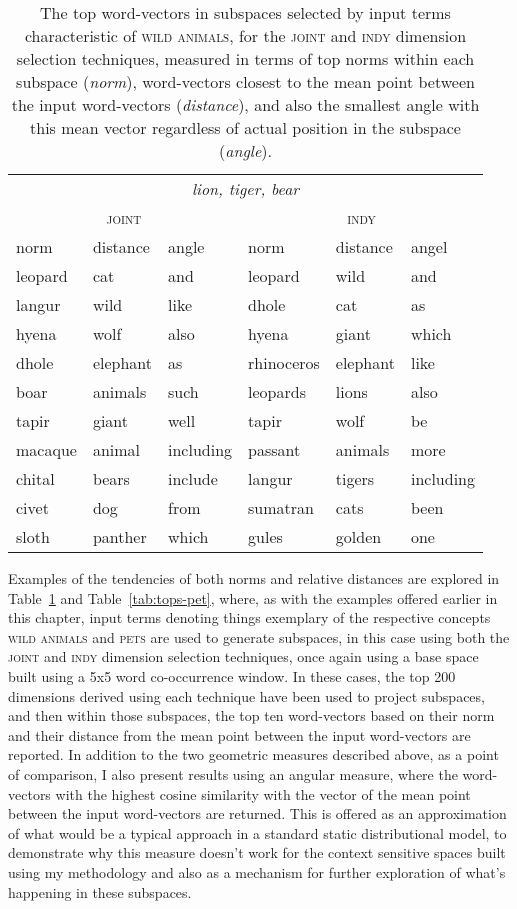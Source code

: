 \begin{table}
\centering
\begin{tabular}{lll|lll}
\hline
\multicolumn{6}{c}{\emph{lion, tiger, bear}} \\
\multicolumn{3}{c}{\textsc{joint}} & \multicolumn{3}{c}{\textsc{indy}} \\
\hline
norm & distance & angle & norm & distance & angel \\
\hline
leopard & cat & and & leopard & wild & and \\
langur & wild & like & dhole & cat & as \\
hyena & wolf & also & hyena & giant & which \\
dhole & elephant & as & rhinoceros & elephant & like \\
boar & animals & such & leopards & lions & also \\
tapir & giant & well & tapir & wolf & be \\
macaque & animal & including & passant & animals & more \\
chital & bears & include & langur & tigers & including \\
civet & dog & from & sumatran & cats & been \\
sloth & panther & which & gules & golden & one \\
\hline
\end{tabular}
\caption[Top Wild Animal Word-Vectors]{The top word-vectors in subspaces selected by input terms characteristic of \textsc{wild animals}, for the \textsc{joint} and \textsc{indy} dimension selection techniques, measured in terms of top norms within each subspace (\emph{norm}), word-vectors closest to the mean point between the input word-vectors (\emph{distance}), and also the smallest angle with this mean vector regardless of actual position in the subspace (\emph{angle}).}
\label{tab:tops-wild}
\end{table}

Examples of the tendencies of both norms and relative distances are explored in Table~\ref{tab:tops-wild} and Table~\ref{tab:tops-pet}, where, as with the examples offered earlier in this chapter, input terms denoting things exemplary of the respective concepts \textsc{wild animals} and \textsc{pets} are used to generate subspaces, in this case using both the \textsc{joint} and \textsc{indy} dimension selection techniques, once again using a base space built using a 5x5 word co-occurrence window.  In these cases, the top 200 dimensions derived using each technique have been used to project subspaces, and then within those subspaces, the top ten word-vectors based on their norm and their distance from the mean point between the input word-vectors are reported.  In addition to the two geometric measures described above, as a point of comparison, I also present results using an angular measure, where the word-vectors with the highest cosine similarity with the vector of the mean point between the input word-vectors are returned.  This is offered as an approximation of what would be a typical approach in a standard static distributional model, to demonstrate why this measure doesn't work for the context sensitive spaces built using my methodology and also as a mechanism for further exploration of what's happening in these subspaces.

